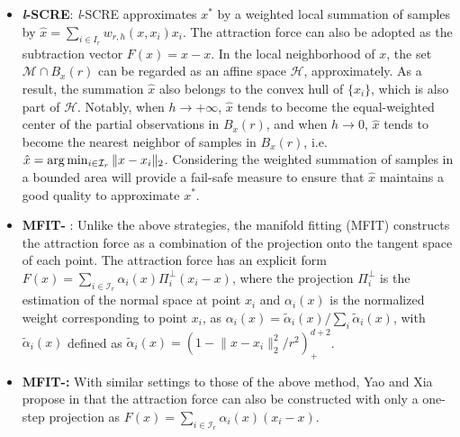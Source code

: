 \documentclass[aos,preprint]{imsart}
\theoremstyle{remark}
\begin{document}
\begin{appendix}
\begin{itemize}
\item{\bf {\it l}-SCRE}:  {\it l}-SCRE approximates ${x}^*$ by a weighted local summation of samples by $\hat{x} = \sum_{i\in I_r} w_{r,h} ({x}, x_i)x_i$. The attraction force can also be adopted as the subtraction vector $F(x) = \hat{x}-x$. In the local neighborhood of ${x}$, the set ${\mathcal M} \cap  B_{{x}}(r)$ can be regarded as an affine space $\mathcal H$, approximately. As a result, the summation $\hat{x}$ also belongs to the convex hull of $\{x_i\}$, which is also part of $\mathcal H$. Notably, when $h\rightarrow +\infty$, $\hat{x}$ tends to become the equal-weighted center of the partial observations in $B_{{x}}(r)$, and when $h\rightarrow 0$, $\hat{x}$ tends to become the nearest neighbor of samples in $B_{{x}}(r)$, i.e. $\hat{x} = \arg\min_{i \in {\cal I}_r} \|{x}-x_i\|_2$. Considering the weighted summation of samples in a bounded area will provide a fail-safe measure to ensure that $\hat{x}$ maintains a good quality to approximate ${x}^*$.
\item{\bf MFIT-} :  Unlike the above strategies, the manifold fitting (MFIT) \citep{fefferman2018fitting} constructs the attraction force as a combination of the projection onto the tangent space of each point. The attraction force has an explicit form $F(x)= \sum_{i\in{\mathcal I}_r}\alpha_i(x) \Pi_i^\perp (x_i - x)$, where the projection $\Pi_i^\perp$ is the estimation of the normal space at point $x_i$ and $\alpha_i(x)$ is the normalized weight corresponding to point $x_i$, as $\alpha_i(x) = \tilde{\alpha}_i(x)/ \sum_i \tilde{\alpha}_i(x)$, with $\tilde{\alpha}_i(x)$ defined as $\tilde{\alpha}_i(x) = (1-{\|x-x_i\|_2^2}/{r^2})^{d+2}_+$.
\item{\bf MFIT-:} With similar settings to those of the above method, Yao and Xia propose in \cite{yao2019manifold} that the attraction force can also be constructed with only a one-step projection as $F(x)= \sum_{i\in{\mathcal I}_r}\alpha_i(x)  (x_i - x)$.
\end{itemize}

\end{appendix}
\end{document}
